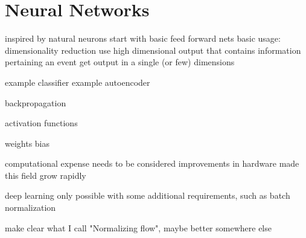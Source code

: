 \section{Neural Networks}
\label{sec:neurals}
inspired by natural neurons
start with basic feed forward nets
basic usage: dimensionality reduction
	use high dimensional output that contains information pertaining an event
	get output in a single (or few) dimensions
	
example classifier
example autoencoder

backpropagation

activation functions

weights
bias

computational expense needs to be considered
improvements in hardware made this field grow rapidly 

deep learning only possible with some additional requirements, such as batch normalization

make clear what I call "Normalizing flow", maybe better somewhere else



